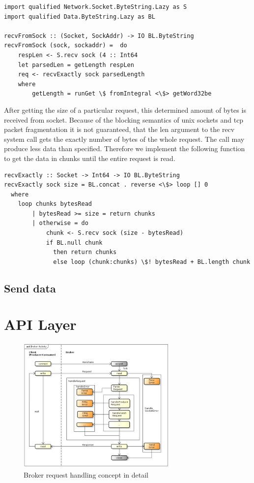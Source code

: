 \begin{lstlisting}
import qualified Network.Socket.ByteString.Lazy as S 
import qualified Data.ByteString.Lazy as BL

recvFromSock :: (Socket, SockAddr) -> IO BL.ByteString
recvFromSock (sock, sockaddr) =  do 
    respLen <- S.recv sock (4 :: Int64
    let parsedLen = getLength respLen
    req <- recvExactly sock parsedLength 
    where
        getLength = runGet \$ fromIntegral <\$> getWord32be
\end{lstlisting}

After getting the size of a particular request, this determined amount of bytes
is received from socket. Because of the blocking semantics of unix sockets and
tcp packet fragmentation it is not guaranteed, that the len argument to the recv
system call gets the exactly number of bytes of the whole request. The call may produce
less data than specified. Therefore we implement the following function to get
the data in
chunks until the entire request is read. 

\begin{lstlisting}
recvExactly :: Socket -> Int64 -> IO BL.ByteString 
recvExactly sock size = BL.concat . reverse <\$> loop [] 0 
  where
    loop chunks bytesRead
        | bytesRead >= size = return chunks
        | otherwise = do  
            chunk <- S.recv sock (size - bytesRead)
            if BL.null chunk 
              then return chunks 
              else loop (chunk:chunks) \$! bytesRead + BL.length chunk 
\end{lstlisting}

\subsection{Send data}


\section{API Layer}

\begin{figure}[H]
    \centering
    \includegraphics[width=0.7\textwidth]{images/broker-activity-detail.png}
    \caption{Broker request handling concept in detail}
    \label{fig:broker-activity-detail.png}
\end{figure}


